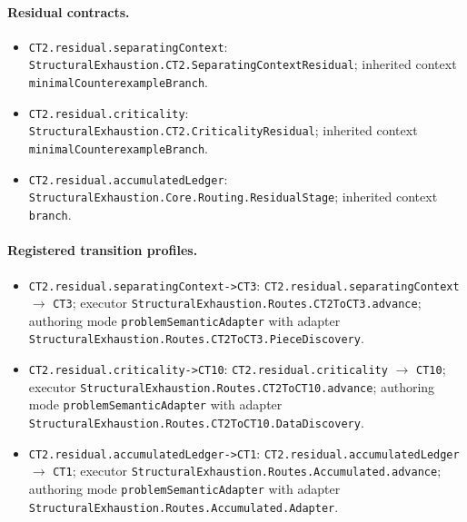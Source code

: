 \begingroup\small\sloppy
\paragraph{Residual contracts.}
\begin{itemize}
\item \texttt{CT2.\allowbreak{}residual.\allowbreak{}separating\allowbreak{}Context}: \texttt{Structural\allowbreak{}Exhaustion.\allowbreak{}CT2.\allowbreak{}Separating\allowbreak{}Context\allowbreak{}Residual}; inherited context \texttt{minimal\allowbreak{}Counterex\allowbreak{}ample\allowbreak{}Branch}.
\item \texttt{CT2.\allowbreak{}residual.\allowbreak{}criticality}: \texttt{Structural\allowbreak{}Exhaustion.\allowbreak{}CT2.\allowbreak{}Criticality\allowbreak{}Residual}; inherited context \texttt{minimal\allowbreak{}Counterex\allowbreak{}ample\allowbreak{}Branch}.
\item \texttt{CT2.\allowbreak{}residual.\allowbreak{}accumulated\allowbreak{}Ledger}: \texttt{Structural\allowbreak{}Exhaustion.\allowbreak{}Core.\allowbreak{}Routing.\allowbreak{}Residual\allowbreak{}Stage}; inherited context \texttt{branch}.
\end{itemize}
\paragraph{Registered transition profiles.}
\begin{itemize}
\item \texttt{CT2.\allowbreak{}residual.\allowbreak{}separating\allowbreak{}Context-\allowbreak{}>CT3}: \texttt{CT2.\allowbreak{}residual.\allowbreak{}separating\allowbreak{}Context} $\to$ \texttt{CT3}; executor \texttt{Structural\allowbreak{}Exhaustion.\allowbreak{}Routes.\allowbreak{}CT2\allowbreak{}To\allowbreak{}CT3.\allowbreak{}advance}; authoring mode \texttt{problem\allowbreak{}Semantic\allowbreak{}Adapter} with adapter \texttt{Structural\allowbreak{}Exhaustion.\allowbreak{}Routes.\allowbreak{}CT2\allowbreak{}To\allowbreak{}CT3.\allowbreak{}Piece\allowbreak{}Discovery}.
\item \texttt{CT2.\allowbreak{}residual.\allowbreak{}criticality-\allowbreak{}>CT10}: \texttt{CT2.\allowbreak{}residual.\allowbreak{}criticality} $\to$ \texttt{CT10}; executor \texttt{Structural\allowbreak{}Exhaustion.\allowbreak{}Routes.\allowbreak{}CT2\allowbreak{}To\allowbreak{}CT10.\allowbreak{}advance}; authoring mode \texttt{problem\allowbreak{}Semantic\allowbreak{}Adapter} with adapter \texttt{Structural\allowbreak{}Exhaustion.\allowbreak{}Routes.\allowbreak{}CT2\allowbreak{}To\allowbreak{}CT10.\allowbreak{}Data\allowbreak{}Discovery}.
\item \texttt{CT2.\allowbreak{}residual.\allowbreak{}accumulated\allowbreak{}Ledger-\allowbreak{}>CT1}: \texttt{CT2.\allowbreak{}residual.\allowbreak{}accumulated\allowbreak{}Ledger} $\to$ \texttt{CT1}; executor \texttt{Structural\allowbreak{}Exhaustion.\allowbreak{}Routes.\allowbreak{}Accumulated.\allowbreak{}advance}; authoring mode \texttt{problem\allowbreak{}Semantic\allowbreak{}Adapter} with adapter \texttt{Structural\allowbreak{}Exhaustion.\allowbreak{}Routes.\allowbreak{}Accumulated.\allowbreak{}Adapter}.
\end{itemize}
\endgroup
